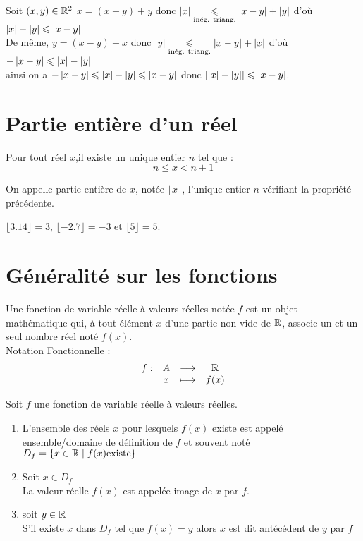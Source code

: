 \begin{dem}
	Soit \((x,y) \in \mathbb{R}^2\)
	\(x =(x-y)+y\) donc \(\left\lvert x\right\rvert \underset{\mathrm{\text{inég. triang.}}}{\leqslant} \left\lvert x-y\right\rvert+\left\lvert y\right\rvert\) d'où \(\left\lvert x\right\rvert - \left\lvert y\right\rvert \leqslant \left\lvert x-y\right\rvert\) \\
	De même, \(y =(x-y)+x\) donc \(\left\lvert y\right\rvert \underset{\mathrm{\text{inég. triang.}}}{\leqslant} \left\lvert x-y\right\rvert+\left\lvert x\right\rvert\) d'où \( -\left\lvert x-y\right\rvert \leqslant\left\lvert x\right\rvert - \left\lvert y\right\rvert\)\\

	ainsi on a \(-\left\lvert x-y\right\rvert \leqslant\left\lvert x\right\rvert - \left\lvert y\right\rvert \leqslant \left\lvert x-y\right\rvert\) donc \(\left\lvert\left\lvert x\right\rvert-\left\lvert y\right\rvert\right\rvert \leqslant\left\lvert x-y\right\rvert\).
\end{dem}

\section{Partie entière d'un réel}
\begin{prop}
	Pour tout réel \(x\),il existe un unique entier \(n\) tel que :
	\[n\leq x < n+1\]
\end{prop}
\begin{defi}
	On appelle partie entière de \(x\), notée \(\lfloor x \rfloor\), l'unique entier \(n\) vérifiant la propriété précédente.
\end{defi}

\begin{ex}
	\(\lfloor 3.14 \rfloor = 3\), \(\lfloor -2.7 \rfloor = -3\) et \(\lfloor 5 \rfloor = 5\).
\end{ex}

\section{Généralité sur les fonctions}
\begin{defi} [Fonction]
	Une fonction de variable réelle à valeurs réelles notée \(f\) est un objet mathématique qui, à tout élément \(x\) d’une partie non vide de \(\mathbb{R}\), associe un et un seul nombre réel noté \(f(x)\). \\
	\underline{Notation Fonctionnelle} : \[\begin{array}[t]{cccc}f : & A & \longrightarrow & \mathbb{R} \\ & x & \longmapsto & f(x)\end{array}\]
\end{defi}

\begin{defi}
	Soit \(f\) une fonction de variable réelle à valeurs réelles.
	\begin{enumerate}
		\item L’ensemble des réels \(x\) pour lesquels \(f(x)\) existe est appelé ensemble/domaine de définition de \(f\) et souvent noté \(D_f = \left\lbrace x \in \mathbb{R} \;\middle|\; f(x) \text{existe}\right\rbrace\)
		\item Soit \(x \in D_f\)\\
		      La valeur réelle \(f(x)\) est appelée image de \(x\) par \(f\). \\
		\item soit \( y \in \mathbb{R}\) \\
		      S'il existe \(x\) dans \(D_f\) tel que \(f(x) = y\) alors \(x\) est dit antécédent de \(y\) par \(f\)
	\end{enumerate}
\end{defi}

